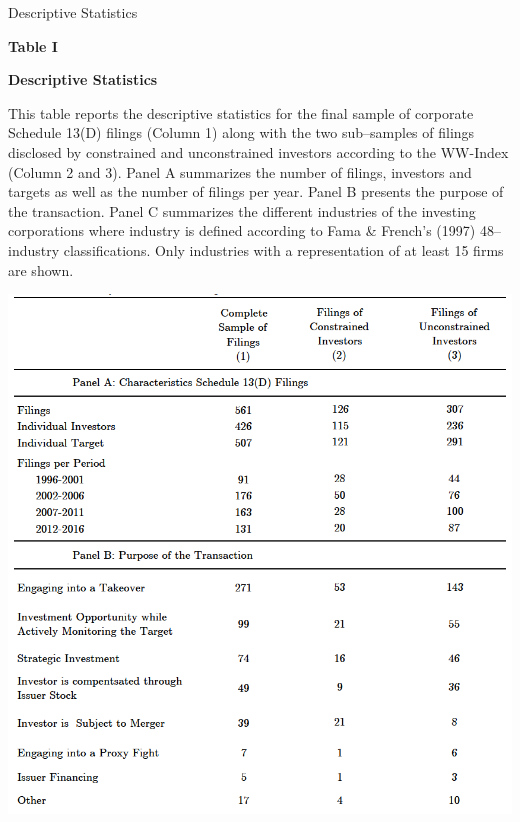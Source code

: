 \documentclass[12pt]{article}
\begin{document}
\begin{table}[!htbp]
	\centering
	\captionsetup{textformat=empty,labelformat=blank}
	\caption{Descriptive Statistics}
	\textbf{Table I}\par\medskip
	\large\textbf{Descriptive Statistics}\par\medskip
	\justifying
	\footnotesize\noindent{}This table reports the descriptive statistics for the final sample of corporate Schedule 13(D) filings (Column 1) along with the two sub–samples of filings disclosed by constrained and unconstrained investors according to the WW-Index (Column 2 and 3). Panel A summarizes the number of filings, investors and targets as well as the number of filings per year. Panel B presents the purpose of the transaction. Panel C summarizes the different industries of the investing corporations where industry is defined according to Fama \& French’s (1997) 48–industry classifications. Only industries with a representation of at least 15 firms are shown.\par\medskip
	\centering													
	\begin{adjustbox}{width=\textwidth}
		\includegraphics{descriptive1final}
	\end{adjustbox}\par\medskip
\end{table}
\end{document}
